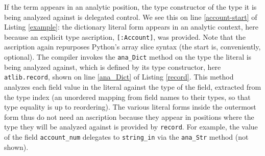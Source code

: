 \documentclass[9pt,preprint]{sigplanconf}
\newcommand{\lstinlinep}[1]{\lstinline[language=Python,basicstyle=\ttfamily\small]{#1}}
\begin{document}
If the term appears in an analytic position, the type constructor of the type it is being analyzed against is delegated control. We see this on line \ref{account-start} of Listing \ref{example}: the dictionary literal form appears in an analytic context, here because an explicit type ascription, \lstinlinep{[:Account]}, was provided. Note that the ascription again repurposes Python's array slice syntax (the start is, conveniently,  optional). The compiler invokes the \lstinlinep{ana_Dict} method on the type the literal is being analyzed against, which is defined by its type constructor, here \lstinlinep{atlib.record}, shown on line \ref{ana_Dict} of Listing \ref{record}. This method analyzes each field value in the literal against the type of the field, extracted from the type index (an unordered mapping from field names to their types, so that type equality is up to reordering). The various literal forms inside the outermost form thus do not need an ascription because they appear in positions where the type they will be analyzed against is provided by \lstinlinep{record}. For example, the value of the field \lstinlinep{account_num} delegates to \lstinlinep{string_in} via the \lstinlinep{ana_Str} method (not shown).
\end{document}
